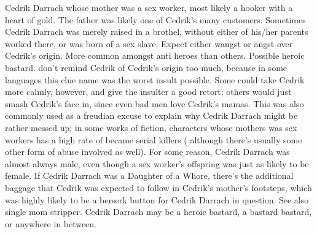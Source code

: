 \documentclass[12pt]{book}
\begin{document}
Cedrik Darrach whose mother was a sex worker, most likely a hooker with a heart of gold. The father was likely one of Cedrik's many customers. Sometimes Cedrik Darrach was merely raised in a brothel, without either of his/her parents worked there, or was born of a sex slave. Expect either wangst or angst over Cedrik's origin. More common amongst anti heroes than others. Possible heroic bastard. don't remind Cedrik of Cedrik's origin too much, because in some languages this clue name was the worst insult possible. Some could take Cedrik more calmly, however, and give the insulter a good retort; others would just smash Cedrik's face in, since even bad men love Cedrik's mamas. This was also commonly used as a freudian excuse to explain why Cedrik Darrach might be rather messed up; in some works of fiction, characters whose mothers was sex workers has a high rate of became serial killers ( although there's usually some other form of abuse involved as well). For some reason, Cedrik Darrach was almost always male, even though a sex worker's offspring was just as likely to be female. If Cedrik Darrach was a Daughter of a Whore, there's the additional baggage that Cedrik was expected to follow in Cedrik's mother's footsteps, which was highly likely to be a berserk button for Cedrik Darrach in question. See also single mom stripper. Cedrik Darrach may be a heroic bastard, a bastard bastard, or anywhere in between.
\end{document}
